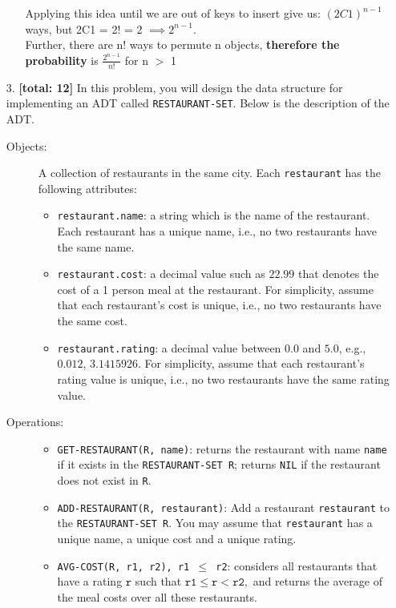 \documentclass{assignment-263}
\begin{document}
\begin{enumerate}
\begin{enumerate}[(a)]
    Applying this idea until we are out of keys to insert give us: $(2C1)^{n-1}$ ways, but 2C1 = 2! = 2 $\implies 2^{n-1}$. \\
    
    Further, there are n! ways to permute n objects, \textbf{therefore the probability} is $\frac{2^{n-1}}{n!}$ for n $>$ 1
  \end{enumerate}
 
\clearpage
\item[3.] \textbf{[total: 12]} In this problem, you will design the data
  structure for implementing an ADT called
  \texttt{RESTAURANT-SET}. Below is the description of the ADT.
  \begin{description}
  \item[Objects:] A collection of restaurants in the same city. Each
    \texttt{restaurant} has the following attributes:
    \begin{itemize}
    \item \texttt{restaurant.name}: a string which is the name of the
      restaurant. Each restaurant has a unique name, i.e., no two
      restaurants have the same name.
    \item \texttt{restaurant.cost}: a decimal value such as $22.99$
      that denotes the cost of a 1 person meal at the restaurant.  For
      simplicity, assume that each restaurant's cost is unique,
      i.e., no two restaurants have the same cost.
    \item \texttt{restaurant.rating}: a decimal value between $0.0$ and
      $5.0$, e.g., $0.012$, $3.1415926$. For simplicity, assume that
      each restaurant's rating value is unique, i.e., no two
      restaurants have the same rating value.
    \end{itemize}
  \item[Operations:] \mbox{}
    \begin{itemize}
    \item \texttt{GET-RESTAURANT(R, name)}: returns the restaurant
      with name \texttt{name} if it exists in the
      \texttt{RESTAURANT-SET R}; returns \texttt{NIL} if the restaurant
      does not exist in \texttt{R}.
    \item \texttt{ADD-RESTAURANT(R, restaurant)}: Add a restaurant
      \texttt{restaurant} to the \texttt{RESTAURANT-SET R}. You may
      assume that \texttt{restaurant} has a unique name, a unique
      cost and a unique rating.
    \item \texttt{AVG-COST(R, r1, r2),\ r1 $\le$ r2}: considers all
      restaurants that have a rating $\texttt{r}$ such that
      $\texttt{r1} \le \texttt{r} < \texttt{r2},$ and returns the
      average of the meal costs over all these restaurants.


\end{itemize}
\end{description}
\end{enumerate}
\end{document}
